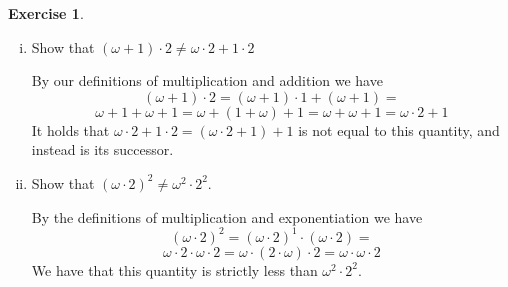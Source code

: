 \documentclass{article}
\theoremstyle{definition}
\newtheorem{exer}{Exercise}[section]
\newlength{\defparindent}
\newenvironment{answer}
    {\begin{mdframed}[backgroundcolor=gray!15, linewidth=0pt] \setlength{\parindent}{\defparindent}}
    {\end{mdframed}}
\begin{document}
\begin{exer}
    \hfill
    \begin{enumerate}[(i)]
        \item Show that $(\omega + 1) \cdot 2 \ne \omega \cdot 2 + 1 \cdot 2$
        \begin{answer}
            By our definitions of multiplication and addition we have 
            \[
                (\omega + 1) \cdot 2
                =
                (\omega + 1) \cdot 1 + (\omega + 1)
                =
            \]
            \[
                \omega + 1 + \omega + 1
                =
                \omega + (1 + \omega) + 1
                =
                \omega + \omega + 1
                =
                \omega \cdot 2 + 1
            \]
            It holds that $\omega \cdot 2 + 1 \cdot 2 = (\omega \cdot 2 + 1) + 1$ is not equal to this quantity, and instead is its successor.
        \end{answer}

        \item Show that $(\omega \cdot 2)^2 \ne \omega^2 \cdot 2^2$.
        \begin{answer}
            By the definitions of multiplication and exponentiation we have 
            \[
                (\omega \cdot 2)^2 =   
                (\omega \cdot 2)^1 \cdot (\omega \cdot 2)
                =
            \]
            \[
                \omega \cdot 2 \cdot \omega \cdot 2 
                =
                \omega \cdot (2 \cdot \omega) \cdot 2 
                = 
                \omega \cdot \omega \cdot 2
            \]
            We have that this quantity is strictly less than $\omega^2 \cdot 2^2$.
        \end{answer}
    \end{enumerate}
\end{exer}

\newpage
\end{document}
